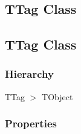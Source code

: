 \documentclass{report}
\begin{document}
\subsection*{\large{\textbf{TTag Class}}\normalsize\hspace{1ex}\hrulefill}
\else
\subsection*{TTag Class}
\fi
\label{PasDoc_TagManager.TTag}
\subsubsection*{\large{\textbf{Hierarchy}}\normalsize\hspace{1ex}\hfill}
TTag {$>$} TObject
\subsubsection*{\large{\textbf{Properties}}\normalsize\hspace{1ex}\hfill}
\end{document}
